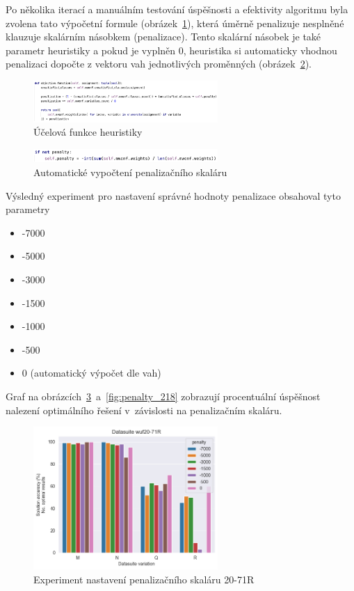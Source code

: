 \documentclass[twoside,twocolumn]{article}
\begin{document}
    Po několika iterací a manuálním testování úspěšnosti a efektivity algoritmu byla zvolena tato výpočetní formule (obrázek~\ref{fig:objective}),
    která úměrně penalizuje nesplněné klauzuje skalárním násobkem (penalizace).
    Tento skalární násobek je také parametr heuristiky a pokud je vyplněn 0, heuristika si automaticky vhodnou penalizaci
    dopočte z vektoru vah jednotlivých proměnných (obrázek~\ref{fig:auto_penalty}).

    \begin{figure}
        \centering
        \includegraphics[width=7cm]{images/objective}
        \caption{Účelová funkce heuristiky}
        \label{fig:objective}
    \end{figure}

    \begin{figure}
        \centering
        \includegraphics[width=7cm]{images/auto_penalty}
        \caption{Automatické vypočtení penalizačního skaláru}
        \label{fig:auto_penalty}
    \end{figure}

    Výsledný experiment pro nastavení správné hodnoty penalizace obsahoval tyto parametry

    \begin{itemize}
        \item -7000
        \item -5000
        \item -3000
        \item -1500
        \item -1000
        \item -500
        \item 0 (automatický výpočet dle vah)
    \end{itemize}

    Graf na obrázcích~\ref{fig:penalty_71}~a~\ref{fig:penalty_218} zobrazují procentuální úspěšnost nalezení optimálního řešení
    v~závislosti na penalizačním skaláru.

    \begin{figure}
        \centering
        \includegraphics[width=7cm]{images/testing/penalty/wuf20-71R}
        \caption{Experiment nastavení penalizačního skaláru 20-71R}
        \label{fig:penalty_71}
    \end{figure}
\end{document}
